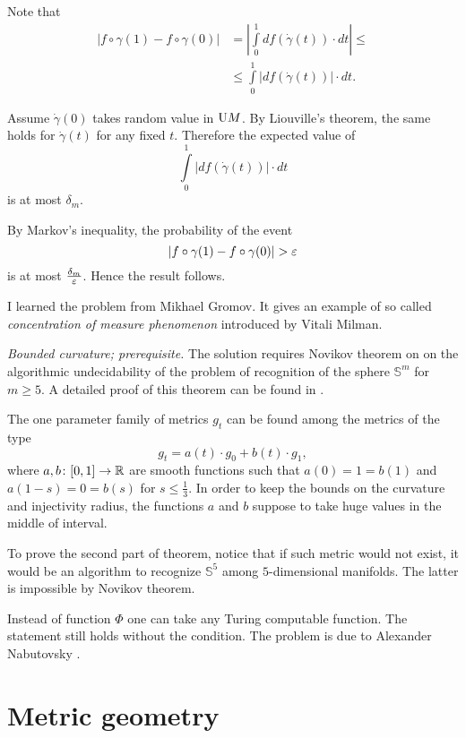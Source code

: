 Note that 
\begin{align*}
|f\circ \gamma(1)-f\circ\gamma(0)|
&=
\left|\int\limits_0^1df(\dot\gamma(t))\cdot dt\right|\le \\
&\le \int\limits_0^1\left|df(\dot\gamma(t))\right|\cdot dt.
\end{align*}

Assume $\dot\gamma(0)$
takes random value in $\mathrm{U} M$.
By Liouville's theorem, the same holds for $\dot\gamma(t)$
for any fixed $t$.
Therefore
the expected value of
\[\int\limits_0^1|df(\dot\gamma(t))|\cdot dt\]
is at most $\delta_m$.

By Markov's inequality,
the probability of the event 
\[|f\circ \gamma(1)-f\circ\gamma(0)|>\eps\]
is at most $\tfrac{\delta_m}{\varepsilon}$.
Hence the result follows.


I learned the problem from Mikhael Gromov.
It gives an example 
of so called \emph{concentration of measure phenomenon}
introduced by Vitali Milman.
 
\textit{Bounded curvature; prerequisite.}
The solution requires Novikov theorem on on  the algorithmic undecidability of the problem of recognition of the sphere $\mathbb S^m$ for
$m\ge 5$. 
A detailed proof of this theorem can be found in \cite{nabutovsky-NovThm}.

The one parameter family of metrics $g_t$
can be found among the metrics of the type 
\[g_t=a(t)\cdot g_0+b(t)\cdot g_1,\]
where $a,b\colon[0,1]\to\mathbb{R}$
are smooth functions such that $a(0)=1=b(1)$ and $a(1-s)=0=b(s)$ for $s\le \tfrac13$.
In order to keep the bounds on the curvature and injectivity radius,
the functions $a$ and $b$
suppose to take huge values in the middle of interval.

To prove the second part of theorem, notice that if such metric would not exist, 
it would be an algorithm to recognize $\mathbb S^5$ among $5$-dimensional manifolds.
The latter is impossible by Novikov theorem.

Instead of function $\Phi$ one can take any Turing computable function.
The statement still holds without the condition.
The problem is due to Alexander Nabutovsky \cite[see][]{nabutovsky-Disconnectedness}.


\section*{Metric geometry}



